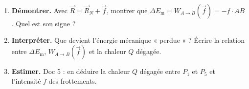 \documentclass[10pt,a4paper]{article}
\newcommand{\kw}[1]{{\sffamily\bfseries\color{cBlue}#1}}
\newcommand{\vect}[1]{\overrightarrow{#1}}
\newcommand{\Em}{E_{\mathrm{m}}}
\newcommand{\WAB}[1]{W_{A\to B}(\vect{#1})}
\begin{document}
\begin{minipage}[t]{0.49\linewidth}\vspace{0pt}\RaggedRight
\begin{enumerate}[start=4]
  \item \kw{Démontrer.} Avec $\vect R = \vect R_N + \vect f$, montrer que $\Delta\Em = \WAB f = -f\cdot AB$. Quel est son signe ?
  \item \kw{Interpréter.} Que devient l’énergie mécanique « perdue » ? Écrire la relation entre $\Delta\Em$, $\WAB f$ et la chaleur $Q$ dégagée.
  \item \kw{Estimer.} Doc 5 : en déduire la chaleur $Q$ dégagée entre $P_1$ et $P_5$ et l’intensité $f$ des frottements.
\end{enumerate}
\end{minipage}
\end{document}
